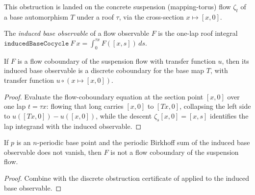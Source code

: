 This obstruction is landed on the concrete suspension (mapping-torus) flow \(\zeta_t\) of a base
automorphism \(T\) under a roof \(\tau\), via the cross-section \(x\mapsto[x,0]\).

\begin{definition}\label{def:livsic-induced}
  \leanok
  The \emph{induced base observable} of a flow observable \(F\) is the one-lap roof integral
  \(\texttt{inducedBaseCocycle}\ F\ x = \int_0^{\tau x} F([x,s])\,ds\).
\end{definition}

\begin{theorem}\label{thm:livsic-induced-cob}
  \leanok
  If \(F\) is a flow coboundary of the suspension flow with transfer function \(u\), then its induced
  base observable is a discrete coboundary for the base map \(T\), with transfer function
  \(u\circ(x\mapsto[x,0])\).
\end{theorem}
\begin{proof}\leanok
  Evaluate the flow-coboundary equation at the section point \([x,0]\) over one lap \(t = \tau x\):
  flowing that long carries \([x,0]\) to \([Tx,0]\), collapsing the left side to
  \(u([Tx,0]) - u([x,0])\), while the descent \(\zeta_s[x,0] = [x,s]\) identifies the lap integrand
  with the induced observable.
\end{proof}

\begin{theorem}\label{thm:livsic-flow-tier1}
  \leanok
  If \(p\) is an \(n\)-periodic base point and the periodic Birkhoff sum of the induced base
  observable does not vanish, then \(F\) is not a flow coboundary of the suspension flow.
\end{theorem}
\begin{proof}\leanok
  Combine  with the discrete obstruction certificate of
   applied to the induced base observable.
\end{proof}


